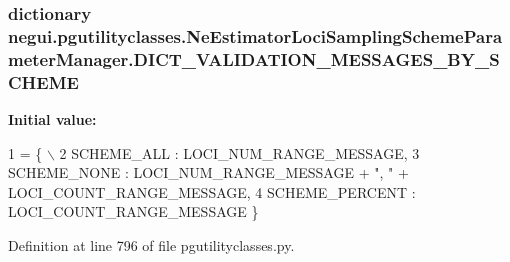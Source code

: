 \subsubsection[{\texorpdfstring{D\+I\+C\+T\+\_\+\+V\+A\+L\+I\+D\+A\+T\+I\+O\+N\+\_\+\+M\+E\+S\+S\+A\+G\+E\+S\+\_\+\+B\+Y\+\_\+\+S\+C\+H\+E\+ME}{DICT_VALIDATION_MESSAGES_BY_SCHEME}}]{\setlength{\rightskip}{0pt plus 5cm}dictionary negui.\+pgutilityclasses.\+Ne\+Estimator\+Loci\+Sampling\+Scheme\+Parameter\+Manager.\+D\+I\+C\+T\+\_\+\+V\+A\+L\+I\+D\+A\+T\+I\+O\+N\+\_\+\+M\+E\+S\+S\+A\+G\+E\+S\+\_\+\+B\+Y\+\_\+\+S\+C\+H\+E\+ME\hspace{0.3cm}{\ttfamily [static]}}\hypertarget{classnegui_1_1pgutilityclasses_1_1NeEstimatorLociSamplingSchemeParameterManager_a91a55ceac6a96f0945c4d8a99a33f110}{}\label{classnegui_1_1pgutilityclasses_1_1NeEstimatorLociSamplingSchemeParameterManager_a91a55ceac6a96f0945c4d8a99a33f110}
{\bfseries Initial value\+:}
\begin{DoxyCode}
1 = \{ \(\backslash\)
2                     SCHEME\_ALL :  LOCI\_NUM\_RANGE\_MESSAGE,
3                     SCHEME\_NONE : LOCI\_NUM\_RANGE\_MESSAGE + \textcolor{stringliteral}{", "} + LOCI\_COUNT\_RANGE\_MESSAGE,             
4                     SCHEME\_PERCENT : LOCI\_COUNT\_RANGE\_MESSAGE \}
\end{DoxyCode}


Definition at line 796 of file pgutilityclasses.\+py.

